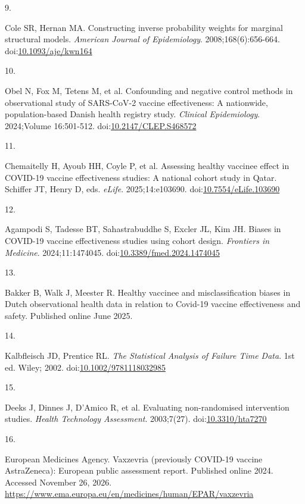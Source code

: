 \documentclass[
]{article}
\newlength{\cslhangindent}
\newlength{\csllabelwidth}
\newenvironment{CSLReferences}[2] %
 {\begin{list}{}{%
  \setlength{\itemindent}{0pt}
  \setlength{\leftmargin}{0pt}
  \setlength{\parsep}{0pt}
  \ifodd #1
   \setlength{\leftmargin}{\cslhangindent}
   \setlength{\itemindent}{-1\cslhangindent}
  \fi
  \setlength{\itemsep}{#2\baselineskip}}}
 {\end{list}}
\newcommand{\CSLLeftMargin}[1]{\parbox[t]{\csllabelwidth}{\strut#1\strut}}
\newcommand{\CSLRightInline}[1]{\parbox[t]{\linewidth - \csllabelwidth}{\strut#1\strut}}
\begin{document}
\begin{CSLReferences}{0}{1}
\CSLLeftMargin{9. }%
\CSLRightInline{Cole SR, Hernan MA. Constructing inverse probability weights for marginal structural models. \emph{American Journal of Epidemiology}. 2008;168(6):656-664. doi:\href{https://doi.org/10.1093/aje/kwn164}{10.1093/aje/kwn164}}

\CSLLeftMargin{10. }%
\CSLRightInline{Obel N, Fox M, Tetens M, et al. Confounding and negative control methods in observational study of {SARS-CoV-2} vaccine effectiveness: A nationwide, population-based {Danish} health registry study. \emph{Clinical Epidemiology}. 2024;Volume 16:501-512. doi:\href{https://doi.org/10.2147/CLEP.S468572}{10.2147/CLEP.S468572}}

\CSLLeftMargin{11. }%
\CSLRightInline{Chemaitelly H, Ayoub HH, Coyle P, et al. Assessing healthy vaccinee effect in {COVID-19} vaccine effectiveness studies: A national cohort study in {Qatar}. Schiffer JT, Henry D, eds. \emph{eLife}. 2025;14:e103690. doi:\href{https://doi.org/10.7554/eLife.103690}{10.7554/eLife.103690}}

\CSLLeftMargin{12. }%
\CSLRightInline{Agampodi S, Tadesse BT, Sahastrabuddhe S, Excler JL, Kim JH. Biases in {COVID-19} vaccine effectiveness studies using cohort design. \emph{Frontiers in Medicine}. 2024;11:1474045. doi:\href{https://doi.org/10.3389/fmed.2024.1474045}{10.3389/fmed.2024.1474045}}

\CSLLeftMargin{13. }%
\CSLRightInline{Bakker B, Walk J, Meester R. Healthy vaccinee and misclassification biases in {Dutch} observational health data in relation to {Covid-19} vaccine effectiveness and safety. Published online June 2025.}

\CSLLeftMargin{14. }%
\CSLRightInline{Kalbfleisch JD, Prentice RL. \emph{The {Statistical Analysis} of {Failure Time Data}}. 1st ed. Wiley; 2002. doi:\href{https://doi.org/10.1002/9781118032985}{10.1002/9781118032985}}

\CSLLeftMargin{15. }%
\CSLRightInline{Deeks J, Dinnes J, D'Amico R, et al. Evaluating non-randomised intervention studies. \emph{Health Technology Assessment}. 2003;7(27). doi:\href{https://doi.org/10.3310/hta7270}{10.3310/hta7270}}

\CSLLeftMargin{16. }%
\CSLRightInline{European Medicines Agency. Vaxzevria (previously COVID-19 vaccine AstraZeneca): European public assessment report. Published online 2024. Accessed November 26, 2026. \url{https://www.ema.europa.eu/en/medicines/human/EPAR/vaxzevria}}


\end{CSLReferences}
\end{document}

